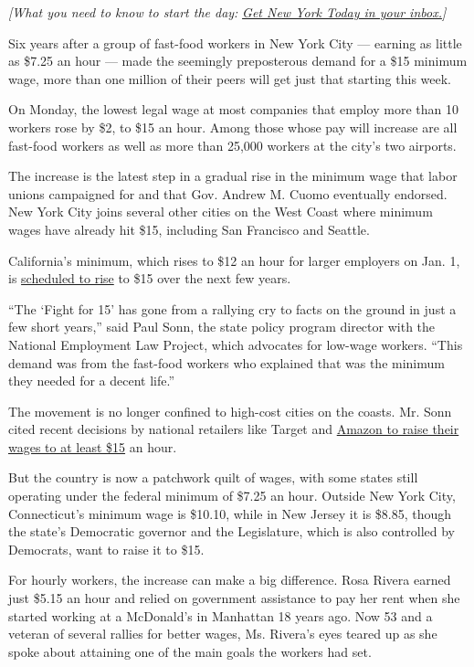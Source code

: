 \emph{{[}What you need to know to start the day:}
\href{https://www.nytimes3xbfgragh.onion/newsletters/newyorktoday?module=inline}{\emph{Get
New York Today in your inbox.}}\emph{{]}}

Six years after a group of fast-food workers in New York City ---
earning as little as \$7.25 an hour --- made the seemingly preposterous
demand for a \$15 minimum wage, more than one million of their peers
will get just that starting this week.

On Monday, the lowest legal wage at most companies that employ more than
10 workers rose by \$2, to \$15 an hour. Among those whose pay will
increase are all fast-food workers as well as more than 25,000 workers
at the city's two airports.

The increase is the latest step in a gradual rise in the minimum wage
that labor unions campaigned for and that Gov. Andrew M. Cuomo
eventually endorsed. New York City joins several other cities on the
West Coast where minimum wages have already hit \$15, including San
Francisco and Seattle.

California's minimum, which rises to \$12 an hour for larger employers
on Jan. 1, is
\href{https://www.dir.ca.gov/dlse/faq_minimumwage.htm}{scheduled to
rise} to \$15 over the next few years.

``The `Fight for 15' has gone from a rallying cry to facts on the ground
in just a few short years,'' said Paul Sonn, the state policy program
director with the National Employment Law Project, which advocates for
low-wage workers. ``This demand was from the fast-food workers who
explained that was the minimum they needed for a decent life.''

The movement is no longer confined to high-cost cities on the coasts.
Mr. Sonn cited recent decisions by national retailers like Target and
\href{https://www.nytimes3xbfgragh.onion/2018/10/02/business/amazon-minimum-wage.html}{Amazon
to raise their wages to at least \$15} an hour.

But the country is now a patchwork quilt of wages, with some states
still operating under the federal minimum of \$7.25 an hour. Outside New
York City, Connecticut's minimum wage is \$10.10, while in New Jersey it
is \$8.85, though the state's Democratic governor and the Legislature,
which is also controlled by Democrats, want to raise it to \$15.

For hourly workers, the increase can make a big difference. Rosa Rivera
earned just \$5.15 an hour and relied on government assistance to pay
her rent when she started working at a McDonald's in Manhattan 18 years
ago. Now 53 and a veteran of several rallies for better wages, Ms.
Rivera's eyes teared up as she spoke about attaining one of the main
goals the workers had set.

